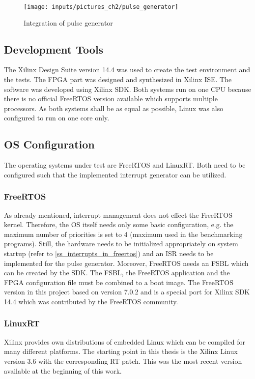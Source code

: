 \begin{figure}[htb]
		\begin{center}
			\texttt{[image: inputs/pictures\_ch2/pulse\_generator]}
			\caption{Integration of pulse generator} \label{fig_pulse_generator}
		\end{center}
\end{figure} 

\subsection{Development Tools}
The Xilinx Design Suite version 14.4 was used to create the test environment and the tests.
The \ac{FPGA} part was designed and synthesized in Xilinx \ac{ISE}.
The software was developed using Xilinx \ac{SDK}.
Both systems run on one \ac{CPU} because there is no official FreeRTOS version available which supports multiple processors.
As both systems shall be as equal as possible, Linux was also configured to run on one core only.

\subsection{\ac{OS} Configuration}
The operating systems under test are FreeRTOS and LinuxRT.
Both need to be configured such that the implemented interrupt generator can be utilized.

\subsubsection{FreeRTOS}
As already mentioned, interrupt management does not effect the FreeRTOS kernel.
Therefore, the \ac{OS} itself needs only some basic configuration, e.g. the maximum number of priorities is set to 4 (maximum used in the benchmarking programs).
Still, the hardware needs to be initialized appropriately on system startup (refer to \ref{ss_interrupts_in_freertos}) and an \ac{ISR} needs to be implemented for the pulse generator. 
Moreover, FreeRTOS needs an \ac{FSBL} which can be created by the \ac{SDK}.
The \ac{FSBL}, the FreeRTOS application and the \ac{FPGA} configuration file must be combined to a boot image.
The FreeRTOS version in this project based on version 7.0.2 and is a special port for Xilinx \ac{SDK} 14.4 which was contributed by the FreeRTOS community.

\subsubsection{LinuxRT}\label{sss_linuxrt}
Xilinx provides own distributions of embedded Linux which can be compiled for many different platforms. 
The starting point in this thesis is the Xilinx Linux version 3.6 with the corresponding RT patch.
This was the most recent version available at the beginning of this work.

